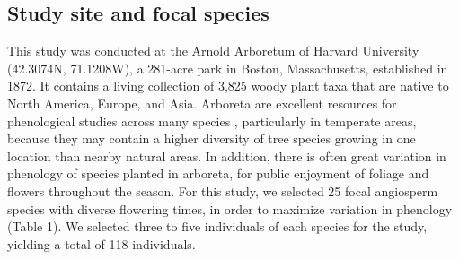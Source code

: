 \documentclass{article}
\begin{document}
\subsection*{Study site and focal species}
This study was conducted at the Arnold Arboretum of Harvard University (42.3074\degree N, 71.1208\degree W), a 281-acre park in Boston, Massachusetts, established in 1872. It contains a living collection of 3,825 woody plant taxa that are native to North America, Europe, and Asia. Arboreta are excellent resources for phenological studies across many species \citep [e.g., ][]{primack2009a}, particularly in temperate areas, because they may contain a higher diversity of tree species growing in one location than nearby natural areas. In addition, there is often great variation in phenology of species planted in arboreta, for public enjoyment of foliage and flowers throughout the season. For this study, we selected 25 focal angiosperm species with diverse flowering times, in order to maximize variation in phenology (Table 1). We selected three to five individuals of each species for the study, yielding a total of 118 individuals.
\end{document}
